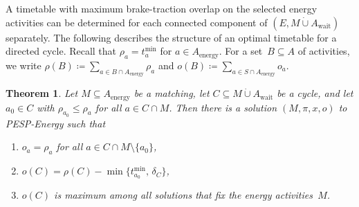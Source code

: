\documentclass[11pt,a4paper]{article}
\newcommand{\dotcup}{\mathbin{\dot\cup}}
\newcommand{\wait}{\mathrm{wait}}
\newcommand{\energy}{\mathrm{energy}}
\newcommand{\energyact}{M}               %
\newcommand{\possenergyact}{A_{\energy}} %
\newcommand{\pespenergy}{PESP-Energy\xspace}
\newcommand{\w}{\rho} %
\newtheorem{theorem}{Theorem}[section]
\theoremstyle{definition}
\theoremstyle{remark}
\begin{document}
A timetable with maximum brake-traction overlap on the selected energy activities can be determined for each connected component of $(E, \energyact \dotcup A_\wait)$ separately. The following  describes the structure of an optimal timetable for a directed cycle. Recall that $\w_a = t_a^{\min}$ for $a \in \possenergyact$. For a set~$B \subseteq A$ of activities, we write $\w(B) \coloneqq \sum_{a \in B \cap \possenergyact} \w_a$ and $o(B) \coloneqq \sum_{a \in S \cap \possenergyact} o_a$.

\begin{theorem}\label{thm:struc-cycle}
Let $\energyact \subseteq \possenergyact$ be a matching, let $C \subseteq \energyact \dotcup A_\wait$ be a cycle, and let $a_0 \in C$ with $\w_{a_0} \leq \w_a$ for all $a \in C \cap \energyact$. Then there is a solution $(\energyact, \pi, x, o)$ to \pespenergy such that 
\begin{enumerate}[\normalfont (a)]
    \item $o_a = \w_a$ for all $a \in C \cap \energyact \setminus \{a_0\}$,
    \item $o(C) = \w(C) - \min\{t^{\min}_{a_0},\, \delta_C\}$,
    \item $o(C)$ is maximum among all solutions that fix the energy activities~$\energyact$.
\end{enumerate}
\end{theorem}
\end{document}
